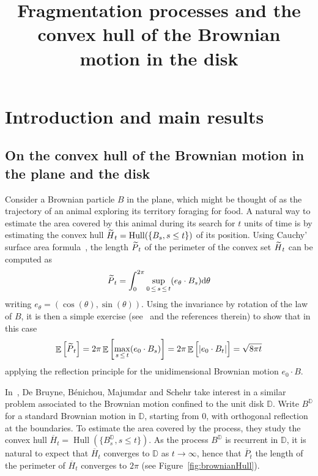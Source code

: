 \documentclass[AHL,Unicode,longabstracts,published]{cedram}
\title[Fragmentations and the convex hull of the Brownian motion]{Fragmentation processes and the convex hull of the Brownian motion in the disk}
\author[\initial{B.} \lastname{Haas}]{\firstname{Bénédicte} \lastname{Haas}}
\author[\initial{B.} \lastname{Mallein}]{\firstname{Bastien} \lastname{Mallein}}
\newcommand{\D}{\mathbb{D}}
\DeclareMathOperator{\E}{\mathbb{E}}
\newcommand{\dd}{\mathrm{d}}
\DeclareMathOperator{\Hull}{Hull}
\renewcommand{\bar}[1]{\overline{#1}}
\renewcommand{\tilde}[1]{\widetilde{#1}}
\let\oldtilde\tilde
\renewcommand*{\tilde}[1]{\mathchoice{\widetilde{#1}}{\widetilde{#1}}{\oldtilde{#1}}{\oldtilde{#1}}}
\begin{document}
\maketitle

\section{Introduction and main results}

\subsection{On the convex hull of the Brownian motion in the plane and the disk}

Consider a Brownian particle $B$ in the plane, which might be thought of as the trajectory of an animal exploring its territory foraging for food. A natural way to estimate the area covered by this animal during its search for $t$ units of time is by estimating the convex hull $\tilde{H}_t = \Hull(\{B_s, s \leq t\})$ of its position. Using Cauchy' surface area formula~\cite{Cau32,TsV}, the length $\tilde{P}_t$ of the perimeter of the convex set $\tilde{H}_t$ can be computed as
\[
\tilde{P}_t = \int_{0}^{2\pi} \sup_{0\,\leq\,s\,\leq\,t} (e_\theta \cdot B_s) \dd \theta
\]
writing $e_\theta = (\cos(\theta),\sin(\theta))$. Using the invariance by rotation of the law of $B$, it is then a simple exercise (see~\cite{Let} and the references therein) to show that in this case
\[
\E\Big[\tilde{P}_t \Big] = 2\pi \E\left[\max_{s \,\leq\,t} (e_0\cdot B_s) \right] = 2\pi \E\Big[|e_0 \cdot B_t|\Big] = \sqrt{8\pi t}
\]
applying the reflection principle for the unidimensional Brownian motion $e_0 \cdot B$.

In~\cite{DBBM22}, De Bruyne, Bénichou, Majumdar and Schehr take interest in a similar problem associated to the Brownian motion confined to the unit disk $\D$. Write $B^\D$ for a standard Brownian motion in $\D$, starting from 0, with orthogonal reflection at the boundaries. To estimate the area covered by the process, they study the convex hull $\bar{H}_t = \Hull(\{B^\D_s, s \leq t\})$. As the process $B^\D$ is recurrent in $\D$, it is natural to expect that $\bar{H}_t$ converges to $\D$ as $t \to \infty$, hence that $\bar{P}_t$ the length of the perimeter of $\bar{H}_t$ converges to $2\pi$ (see Figure~\ref{fig:brownianHull}).
\end{document}
